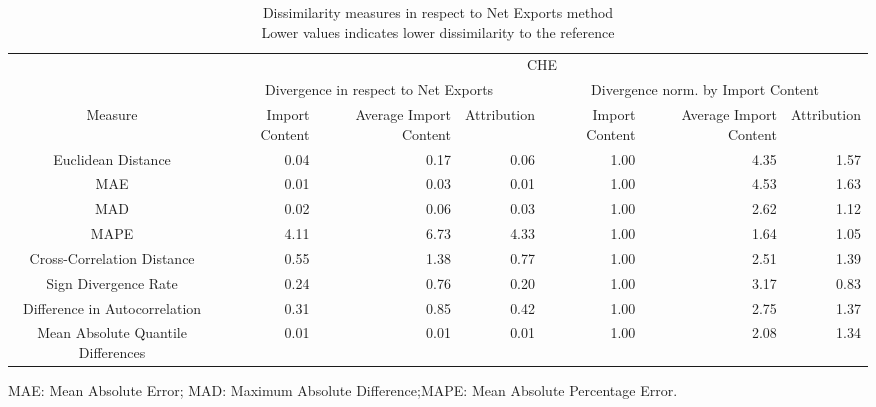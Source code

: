 \begin{table}[t]
\caption*{
{\large Dissimilarity measures in respect to Net Exports method} \\ 
{\small Lower values indicates lower dissimilarity to the reference}
} 
\fontsize{15.0pt}{18.0pt}\selectfont
\begin{tabular*}{\linewidth}{@{\extracolsep{\fill}}crrrrrr}
\toprule
 & \multicolumn{6}{c}{CHE} \\ 
\cmidrule(lr){2-7}
 & \multicolumn{3}{c}{Divergence in respect to Net Exports} & \multicolumn{3}{c}{Divergence norm. by Import Content} \\ 
\cmidrule(lr){2-4} \cmidrule(lr){5-7}
Measure & Import Content & Average Import Content & Attribution & Import Content & Average Import Content & Attribution \\ 
\midrule\addlinespace[2.5pt]
Euclidean Distance & 0.04 & 0.17 & 0.06 & 1.00 & 4.35 & 1.57 \\ 
MAE & 0.01 & 0.03 & 0.01 & 1.00 & 4.53 & 1.63 \\ 
MAD & 0.02 & 0.06 & 0.03 & 1.00 & 2.62 & 1.12 \\ 
MAPE & 4.11 & 6.73 & 4.33 & 1.00 & 1.64 & 1.05 \\ 
Cross-Correlation Distance & 0.55 & 1.38 & 0.77 & 1.00 & 2.51 & 1.39 \\ 
Sign Divergence Rate & 0.24 & 0.76 & 0.20 & 1.00 & 3.17 & 0.83 \\ 
Difference in Autocorrelation & 0.31 & 0.85 & 0.42 & 1.00 & 2.75 & 1.37 \\ 
Mean Absolute Quantile Differences & 0.01 & 0.01 & 0.01 & 1.00 & 2.08 & 1.34 \\ 
\bottomrule
\end{tabular*}
\begin{minipage}{\linewidth}
MAE: Mean Absolute Error; MAD: Maximum Absolute Difference;MAPE: Mean Absolute Percentage Error.\\
\end{minipage}
\end{table}

